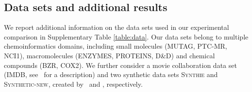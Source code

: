 \documentclass{article}
\begin{document}
\subsection{Data sets and additional results}
\label{app:additional_ds}

\begin{table*}[b]
\caption{Description of the experimental data sets}
\begin{center}
\begin{sc}
\end{sc}
\end{center}
\label{table:data}
\vskip -0.1in
\end{table*}
We report additional information on the data sets used in our experimental comparison in Supplementary Table \ref{table:data}.
Our data sets belong to multiple chemoinformatics domains, including small molecules (\textsc{MUTAG}, \textsc{PTC-MR}, \textsc{NCI1}), macromolecules (\textsc{ENZYMES}, \textsc{PROTEINS}, \textsc{D\&D}) and chemical compounds (\textsc{BZR}, \textsc{COX2}). We further consider a movie collaboration data set (\textsc{IMDB}, see~\citep{yanardag2015deep} for a description) and two synthetic data sets \textsc{Synthie} and \textsc{Synthetic-new}, created by~\citet{morris2016faster} and \citet{feragen2013scalable}, respectively.
\end{document}
